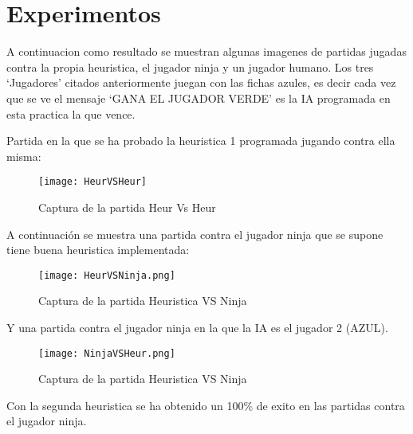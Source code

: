 \section{Experimentos}
\label{sec:experimentos}
	A continuacion como resultado se muestran algunas imagenes de partidas jugadas contra la propia heuristica, el jugador ninja y un jugador humano. Los tres `Jugadores'  citados anteriormente juegan con las fichas azules, es decir cada vez que se ve el mensaje `GANA EL JUGADOR VERDE' es la IA programada en esta practica la que vence.


	Partida en la que se ha probado la heuristica 1 programada jugando contra ella misma:

		\begin{figure} [H]
			\begin{center}
				\texttt{[image: HeurVSHeur]}
				\caption{Captura de la partida Heur Vs Heur}
				\label{uno}
			\end{center}
		\end{figure}

 	A continuación se muestra una partida contra el jugador ninja que se supone tiene buena heuristica implementada:

 	\begin{figure}[H]
 		\begin{center}
		 	\texttt{[image: HeurVSNinja.png]}
		 	\caption{Captura de la partida Heuristica VS Ninja}
		 	\label{dos}
 		\end{center}
 	\end{figure}


 	Y una partida contra el jugador ninja en la que la IA es el  jugador 2 (AZUL).

 	\begin{figure}[H]
		\begin{center}
	 	\texttt{[image: NinjaVSHeur.png]}
	 	\caption{Captura de la partida Heuristica VS Ninja}
	 	\label{dos}
		\end{center}
	\end{figure}

	Con la segunda heuristica se ha obtenido un 100\% de exito en las partidas contra el jugador ninja.




